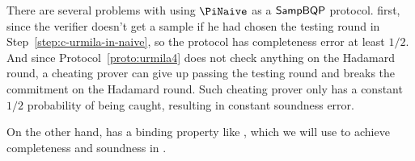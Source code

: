 There are several problems with using $\PiNaive$ as a $\operatorname{\mathsf{SampBQP}}$ protocol. first, since the verifier doesn't get a sample if he had chosen the testing round in Step~\ref{step:c-urmila-in-naive}, so the protocol has  completeness error at least $1/2$. And since Protocol~\ref{proto:urmila4} does not check anything on the Hadamard round, a cheating prover can give up passing the testing round and breaks the commitment on the Hadamard round. Such cheating prover only has a constant $1/2$ probability of being caught, resulting in constant soundness error.




On the other hand,  has a binding property like , which we will use to achieve completeness and soundness in .

